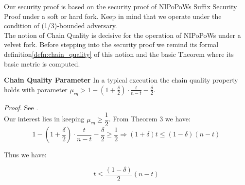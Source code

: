 Our security proof is based on the security proof of NIPoPoWs Suffix Security Proof
under a soft or hard fork. Keep in mind that we operate under the condition of
(1/3)-bounded adversary.\\

The notion of Chain Quality is decisive for the operation of NIPoPoWs under a
velvet fork. Before stepping into the security proof we remind its formal
definition\ref{defn:chain_quality} of this notion and the basic Theorem where its basic metric is computed.\\


\begin{thm}{\textbf{Chain Quality Parameter}}
	In a typical execution the chain quality property holds with parameter $\mu_{cq} > 1 - (1 + \frac{\delta}{2}) \cdot \frac{t}{n-t} - \frac{\delta}{2}$.
\end{thm}
\textit{Proof.} See \cite{Backbone}.\\

Our interest lies in keeping $\mu_{cq} \geq \dfrac{1}{2}$.
From Theorem 3 we have:
\begin{equation*}
	1 - (1 + \frac{\delta}{2}) \cdot \frac{t}{n-t} - \frac{\delta}{2} \geq \dfrac{1}{2} \Rightarrow 
	(1 + \delta)t \leq (1-\delta)(n-t)
\end{equation*}

Thus we have:
\begin{center}
\begin{equation}
	t \leq \dfrac{(1-\delta)}{2}(n - t)
\end{equation}
\end{center}

